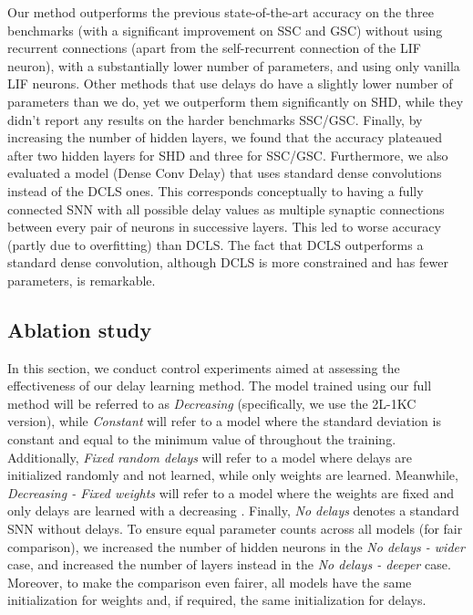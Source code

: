 \documentclass{article} \usepackage{iclr2024_conference,times}
\begin{document}
Our method outperforms the previous state-of-the-art accuracy on the three benchmarks (with a significant improvement on SSC and GSC) without using recurrent connections (apart from the self-recurrent connection of the LIF neuron), with a substantially lower number of parameters, and using only vanilla LIF neurons. Other methods that use delays do have a slightly lower number of parameters than we do, yet we outperform them significantly on SHD, while they didn't report any results on the harder benchmarks SSC/GSC. Finally, by increasing the number of hidden layers, we found that the accuracy plateaued after two hidden layers for SHD and three for SSC/GSC.
Furthermore, we also evaluated a model (Dense Conv Delay) that uses standard dense convolutions instead of the DCLS ones. This corresponds conceptually to having a fully connected SNN with all possible delay values as multiple synaptic connections between every pair of neurons in successive layers. This led to worse accuracy (partly due to overfitting) than DCLS. The fact that DCLS outperforms a standard dense convolution, although DCLS is more constrained and has fewer parameters, is remarkable. 


\subsection{Ablation study}
\label{sec:ablation}

In this section, we conduct control experiments aimed at assessing the effectiveness of our delay learning method. The model trained using our full method will be referred to as \emph{Decreasing } (specifically, we use the 2L-1KC version), while \emph{Constant } will refer to a model where the standard deviation  is constant and equal to the minimum value of  throughout the training. Additionally, \emph{Fixed random delays} will refer to a model where delays are initialized randomly and not learned, while only weights are learned. Meanwhile, \emph{Decreasing  - Fixed weights} will refer to a model where the weights are fixed and only delays are learned with a decreasing . Finally, \emph{No delays} denotes a standard SNN without delays. To ensure equal parameter counts across all models (for fair comparison), we increased the number of hidden neurons in the \emph{No delays - wider} case, and increased the number of layers instead in the \emph{No delays - deeper} case. Moreover, to make the comparison even fairer, all models have the same initialization for weights and, if required, the same initialization for delays.
\end{document}

